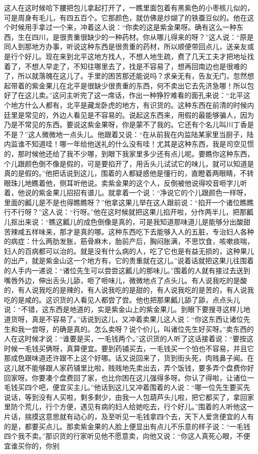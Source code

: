 \documentclass[12pt,UTF8]{ctexbook}
\begin{document}
这人在这时候哈下腰把包儿拿起打开了，一瞧里面包着有黑紫色的小枣核儿似的，可是周身有毛儿，有四五百个。它那颜色，就仿佛是炒煳了的铁蚕豆似的。他在这个时候用手拿过一个来，冲着这人说：“你卖的这是紫金果呀。确有这么一种东西，生在四川，是很贵重很缺少的一种药材。你从哪儿得来的呀？”这人说：“原是同人到那地方办事，听说这种东西是很贵重的药材，所以顺便带回点儿，送亲友或是行个好儿。现在来到北平这地方找人，不想人地生疏，费了几天工夫才把地址找着了，不想人早走了，不知往哪里去了，找是不容易了，想再回南边也是很难的了，所以就落魄在这儿了。手里的困苦那还能说吗？求亲无有，告友无门，忽然想起带着的紫金果儿在北平是很缺少很贵重的东西，何不卖出它去先济急哪！所以包好了在这儿卖。”这问主听完了这一席话，作出一种狰狞难看的面孔来说：“北平这个地方什么人都有，北平是藏龙卧虎的地方，有识货的。这种东西在前清的时候内廷里是常见的，外边人看见是不容易的。说起这东西来，用假的最能够骗人，因为乃是不常见的东西。要说这紫金果呀，你是蒙不了我的。它还有个名儿叫川丁香是不是？”这人微微地一点头儿。他跟着又说：“在从前我在内监陆某家里当厨子，陆内监谁不知道哇！哪一年给他送礼的什么没有哇！尤其是这种东西，我是司空见惯的，那时候他还给了我不少哪，到眼下我家里多少还有点儿呢。要瞧你这种东西，个儿跟颜色倒不像是假的，可是要掐开了，用舌头儿试试它的味儿，就可以知道是真的是假的。”他把话说到这儿，围着的人都疑惑他是懂行的，直瞪着两眼睛，不转眼珠儿地瞧着他，侧耳听他说。卖紫金果的这个人，反倒被他说得咬音咂字儿听着，他说的紫金果儿招招有谱儿。就拿着一个说：“净说它的个儿跟颜色一样呀，里面的瓤儿是不是也得瞧瞧呀？”他拿这果儿举在这人跟前说：“掐开一个诸位瞧瞧行不行呀？”这人说：“行呀。”他在这时候就把这果儿掐开啦，分作两半儿，把那瓤儿抠出来说：“瞧这瓤儿的成色倒像是真的，可是我知道那味道儿是能够分出酸甜苦辣咸五样味来，那才是真的哪。这种东西吃下去能够入人的五脏，专治妇人各种的病症：什么两肋发胀，筋骨麻木，胎前产后，胸闷胀满，不思饮食，咳嗽痰喘，妇人的百病都可以治的。就是没有什么病的人，吃了它也是有益无损的，这种果儿的出产，就是紫金山这一个地方有，它的贵重就在这儿。”说着话就把这果儿往围着的人手内一递说：“诸位先生可以尝尝这瓤儿的那味儿。”围着的人就有接过去送到嘴唇外边，伸出舌头儿舔，咂了咂味儿，微微地点了点头儿。有人说我吃的是酸的，有人说我吃的是辣的，有人说我吃的是甜的，有人说我吃的是苦的，有人说我吃的是咸的。这识货的人看见人都尝了尝。他也把那果瓤儿舔了舔，点点头儿说：“不错，这东西是地道的，实是紫金山上的紫金果儿。到眼下要搜寻这样儿地道货呀，真是不容易了。”话说到这儿，又冲着卖果儿这人说：“你这东西让诸位先生和我一尝呀，的确是真的。怎么卖呀？说个价儿，叫诸位先生好买呀。”卖东西的人在这时候才说：“谁要是买，一毛钱两个。”这识货的人听了这话接着说：“要按这时候一毛钱买俩呀，真算便宜。要到药铺买去，一毛钱买一个怕也不容易，并且它那成色跟味道还许跟不上这个好哪。话又说回来了，货到街头死，肉贱鼻子闻。在这儿就不能够跟人家药铺里比啦，贱贱地先卖出去，弄个饭钱，要多弄个盘费你好回家呀。你要凑个盘费回了家，也比你困在这儿强得多呀。你认了得啦，让诸位一毛钱买四个吧，便宜买主儿。”他话到这儿又冲着围着的人说：“哪一位先生要买先说话，等到没有人买啦，剩多剩少，由我一人包葫芦头儿啦，把它都买了，拿回家里防个荒儿，行个方便，遇见有病的妇人给她吃去，行个好儿。”围着的人听他这一片话，揣摸这意思就有动心的，及至听见一毛钱拿四个去，天下人爱贪便宜的人有的是，都要买点儿。那卖紫金果的人脸上便显出有点儿不乐意的样子说：“一毛钱四个我不卖。”那识货的行家听见他不愿意卖，向他又说：“你这人真死心眼，不便宜谁买你的，你别
\end{document}
